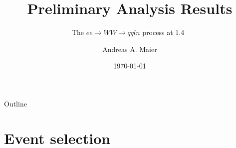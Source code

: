\documentclass{beamer}
\title{Preliminary Analysis Results}
\subtitle{The $ee \rightarrow WW \rightarrow qqln$ process at 1.4~\TeV}
\author{Andreas A. Maier\inst{1}}
\institute[CERN] %
{
  \inst{1}%
  CERN
}
\date{\today}
\begin{document}
\begin{frame}
  \titlepage
\end{frame}






























\begin{frame}{Outline}
  \begin{multicols}{2}
    \tableofcontents
  \end{multicols}
\end{frame}















\section{Event selection}
\end{document}
